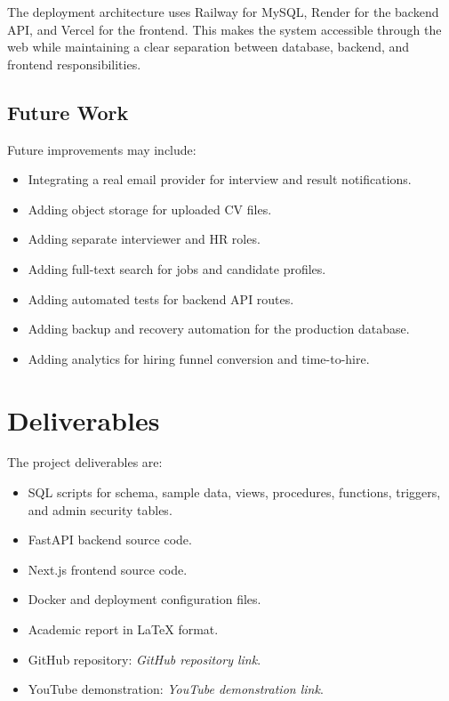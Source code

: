 \documentclass[12pt,a4paper]{report}
\newcommand{\githuburl}{\textit{GitHub repository link}}
\newcommand{\youtubeurl}{\textit{YouTube demonstration link}}
\begin{document}
The deployment architecture uses Railway for MySQL, Render for the backend API, and Vercel for the frontend. This makes the system accessible through the web while maintaining a clear separation between database, backend, and frontend responsibilities.

\section{Future Work}

Future improvements may include:

\begin{itemize}[leftmargin=1.5cm]
  \item Integrating a real email provider for interview and result notifications.
  \item Adding object storage for uploaded CV files.
  \item Adding separate interviewer and HR roles.
  \item Adding full-text search for jobs and candidate profiles.
  \item Adding automated tests for backend API routes.
  \item Adding backup and recovery automation for the production database.
  \item Adding analytics for hiring funnel conversion and time-to-hire.
\end{itemize}

\chapter*{Deliverables}

The project deliverables are:

\begin{itemize}[leftmargin=1.5cm]
  \item SQL scripts for schema, sample data, views, procedures, functions, triggers, and admin security tables.
  \item FastAPI backend source code.
  \item Next.js frontend source code.
  \item Docker and deployment configuration files.
  \item Academic report in \LaTeX{} format.
  \item GitHub repository: \githuburl.
  \item YouTube demonstration: \youtubeurl.
\end{itemize}
\end{document}

